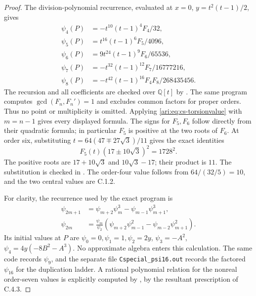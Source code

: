 \begin{proof}
The division-polynomial recurrence, evaluated at $x=0$,
$y=t^2(t-1)/2$, gives
\[
 \begin{aligned}
 \psi_4(P)&=-t^{10}(t-1)^4F_4/32,\\
 \psi_5(P)&=t^{16}(t-1)^6F_5/4096,\\
 \psi_6(P)&=9t^{24}(t-1)^9F_6/65536,\\
 \psi_7(P)&=-t^{32}(t-1)^{12}F_7/16777216,\\
 \psi_8(P)&=-t^{42}(t-1)^{16}F_4F_8/268435456.
 \end{aligned}
\]
The recursion and all coefficients are checked over $\mathbb Q[t]$
by . The same program computes
$\gcd(F_n,F_n')=1$ and excludes common factors for proper orders.
Thus no point or multiplicity is omitted. Applying
\eqref{ari:eq:cs-torsionvalue} with $m=n-1$ gives every displayed
formula. The signs for $F_5,F_6$ follow directly from their quadratic
formula; in particular $F_5$ is positive at the two roots of $F_6$.
At order six, substituting
$t=64(47\mp27\sqrt3)/11$ gives the exact identities
\[
 F_5(t)(17\pm10\sqrt3)^2=1728^2.
\]
The positive roots are $17+10\sqrt3$ and $10\sqrt3-17$; their
product is $11$. The substitution is checked in
. The order-four value follows from
$64/(32/5)=10$, and the two central values are C.1.2.

For clarity, the recurrence used by the exact program is
\[
 \begin{aligned}
 \psi_{2m+1}&=\psi_{m+2}\psi_m^3-\psi_{m-1}\psi_{m+1}^3,\\
 \psi_{2m}&=\frac{\psi_m}{\psi_2}
   (\psi_{m+2}\psi_{m-1}^2-\psi_{m-2}\psi_{m+1}^2).
 \end{aligned}
\]
Its initial values at $P$ are $\psi_0=0,\psi_1=1,\psi_2=2y$,
$\psi_3=-A^2$, $\psi_4=4y(-8B^2-A^3)$. No approximate algebra
enters this calculation. The same code records $\psi_9$, and the
separate file \texttt{Cspecial\_psi16.out} records the factored
$\psi_{16}$ for the duplication ladder. A rational polynomial
relation for the nonreal order-seven values is explicitly computed
by , by the resultant prescription
of C.4.3.
\end{proof}

